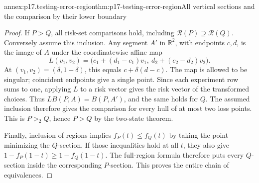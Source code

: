 \begin{annexitem}{annex:p17.testing-error-region}{thm:p17-testing-error-region}{All vertical sections and the comparison by their lower boundary}
\begin{proof}
If \(P>Q\), all risk-set comparisons hold, including
\(\mathcal R(P)\supseteq\mathcal R(Q)\).
Conversely assume this inclusion. Any segment \(A'\) in \(\mathbb R^2\),
with endpoints \(c,d\), is the image of \(A\) under the coordinatewise
affine map
\[
 L(v_1,v_2)=
   \bigl(c_1+(d_1-c_1)v_1,\ d_2+(c_2-d_2)v_2\bigr).
\]
At \((v_1,v_2)=(\delta,1-\delta)\), this equals
\(c+\delta(d-c)\). The map is allowed to be singular; coincident
endpoints give a single point. Since each experiment row sums to one,
applying \(L\) to a risk vector gives the risk vector of the transformed
choices. Thus \(LB(P,A)=B(P,A')\), and the same holds for \(Q\).
The assumed inclusion therefore gives the comparison for every hull
of at most two loss points. This is \(P>_2Q\), hence \(P>Q\) by the
two-state theorem.

Finally, inclusion of regions implies \(f_P(t)\leq f_Q(t)\) by taking
the point minimizing the \(Q\)-section. If those inequalities hold at
all \(t\), they also give
\(1-f_P(1-t)\geq1-f_Q(1-t)\). The full-region formula therefore puts
every \(Q\)-section inside the corresponding \(P\)-section.
This proves the entire chain of equivalences.
\end{proof}
\end{annexitem}

